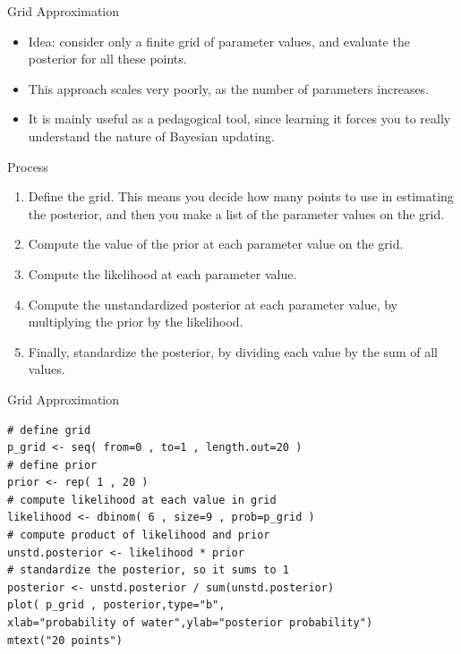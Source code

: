 \documentclass[handout]{beamer}
\begin{document}
\begin{frame}{Grid Approximation}
\scriptsize{

\begin{itemize}

\item Idea: consider only a finite grid of parameter values, and evaluate the posterior for all these points.


\item This approach scales very poorly, as the number of parameters increases.


\item It is mainly useful as a pedagogical tool, since learning it forces you to really understand the nature of Bayesian updating.


\end{itemize}

\begin{block}{Process}
\begin{enumerate}

  \item Define the grid. This means you decide how many points to use in estimating the posterior, and then you make a list of the parameter values on the grid.
\item Compute the value of the prior at each parameter value on the grid.
\item Compute the likelihood at each parameter value.
\item Compute the unstandardized posterior at each parameter value, by multiplying the prior by the likelihood.
\item  Finally, standardize the posterior, by dividing each value by the sum of all values.
\end{enumerate}
\end{block}

} 


\end{frame}

\begin{frame}[fragile]{Grid Approximation}
\begin{scriptsize}
 \begin{verbatim}
# define grid
p_grid <- seq( from=0 , to=1 , length.out=20 )
# define prior
prior <- rep( 1 , 20 )
# compute likelihood at each value in grid
likelihood <- dbinom( 6 , size=9 , prob=p_grid )
# compute product of likelihood and prior
unstd.posterior <- likelihood * prior
# standardize the posterior, so it sums to 1
posterior <- unstd.posterior / sum(unstd.posterior)
plot( p_grid , posterior,type="b",
xlab="probability of water",ylab="posterior probability")
mtext("20 points")
\end{verbatim}
\end{scriptsize}


\end{frame}
\end{document}
